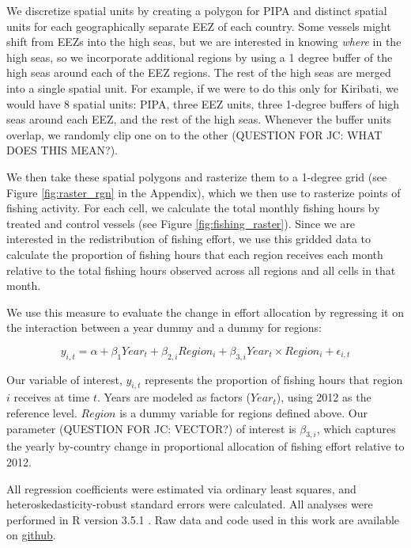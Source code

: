 \documentclass[11pt,english]{article}
\begin{document}
We discretize spatial units by creating a polygon for
PIPA and distinct
spatial units for each geographically separate EEZ of each country. Some vessels might shift
from EEZs into the high seas, but we are interested in knowing
\emph{where} in the high seas, so we incorporate additional regions by
using a 1 degree buffer of the high seas around each of the EEZ regions.
The rest of the high seas are merged into a single spatial unit. For
example, if we were to do this only for Kiribati, we would have 8
spatial units: PIPA, three EEZ units, three 1-degree buffers of high seas
around each EEZ, and the rest of the high seas. Whenever the buffer units
overlap, we randomly clip one on to the other (QUESTION FOR JC: WHAT DOES THIS MEAN?).

We then take these spatial polygons and rasterize them to a 1-degree grid
(see Figure \ref{fig:raster_rgn} in the Appendix), which we then use to rasterize points
of fishing activity. For each cell, we calculate the total monthly
fishing hours by treated and control vessels (see Figure
\ref{fig:fishing_raster}). Since we are interested in the redistribution
of fishing effort, we use this gridded data to calculate the proportion
of fishing hours that each region receives each month relative to the
total fishing hours observed across all regions and all cells in that
month.

We use this measure to evaluate the change in effort allocation by
regressing it on the interaction between a year dummy and a dummy for
regions:

\[
y_{i,t} = \alpha + \beta_1Year_t + \beta_{2,i}Region_i + \beta_{3,i}Year_t \times Region_i+ \epsilon_{i,t}
\]

Our variable of interest, \(y_{i,t}\) represents the proportion of
fishing hours that region \(i\) receives at time \(t\). Years are
modeled as factors (\(Year_t\)), using 2012 as the reference level.
\(Region\) is a dummy variable for regions defined above. Our parameter (QUESTION FOR JC: VECTOR?)
of interest is \(\beta_{3,i}\), which captures the yearly by-country
change in proportional allocation of fishing effort relative to 2012.

All regression coefficients were estimated via ordinary least squares,
and heteroskedasticity-robust standard errors were calculated. All analyses
were performed in R version 3.5.1 \citep{rcore_2018}. Raw data and code
used in this work are available on
\href{https://github.com/jcvdav/MPA_displacement}{github}.

\clearpage
\end{document}

